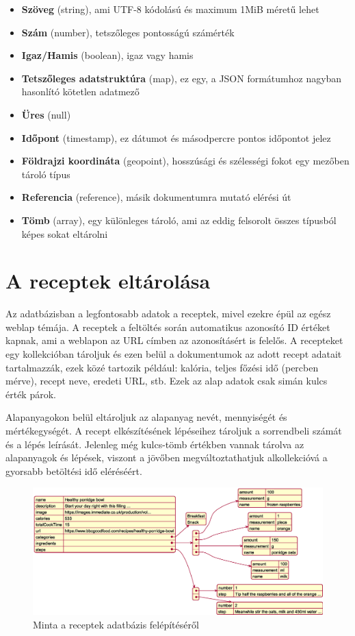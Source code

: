 \documentclass[12pt]{report}
\theoremstyle{definition}
\begin{document}
\begin{itemize}
	\item \textbf{Szöveg} (string), ami UTF-8 kódolású és maximum 1MiB méretű lehet
	\item \textbf{Szám} (number),  tetszőleges pontosságú számérték
	\item \textbf{Igaz/Hamis} (boolean), igaz vagy hamis
	\item \textbf{Tetszőleges adatstruktúra} (map), ez egy, a \Gls{JSON} formátumhoz nagyban hasonlító kötetlen adatmező
	\item \textbf{Üres} (null)
	\item \textbf{Időpont} (timestamp), ez dátumot és másodpercre pontos időpontot jelez

	\item \textbf{Földrajzi koordináta} (geopoint), hosszúsági és szélességi fokot egy mezőben tároló típus

	\item \textbf{Referencia} (reference), másik dokumentumra mutató elérési út
	\item \textbf{Tömb} (array), egy különleges tároló, ami az eddig felsorolt összes típusból képes sokat eltárolni

\end{itemize}
 

\section{A receptek eltárolása}
Az adatbázisban a legfontosabb adatok a receptek, mivel ezekre épül az egész weblap témája. A receptek a feltöltés során automatikus azonosító ID értéket kapnak, ami a weblapon az URL címben az azonosításért is felelős. A recepteket egy kollekcióban tároljuk és ezen belül a dokumentumok az adott recept adatait tartalmazzák, ezek közé tartozik például: kalória, teljes főzési idő (percben mérve), recept neve, eredeti URL, stb. Ezek az alap adatok csak simán kulcs érték párok.

Alapanyagokon belül eltároljuk az alapanyag nevét, mennyiségét és mértékegységét. A recept elkészítésének lépéseihez tároljuk a sorrendbeli számát és a lépés leírását. Jelenleg még kulcs-tömb értékben vannak tárolva az alapanyagok és lépések, viszont a jövőben megváltoztathatjuk alkollekcióvá a gyorsabb betöltési idő eléréséért.

\noindent
\begin{figure}[H]
	\centering
	\includegraphics[width=\textwidth]{out/diagrams/jsonRecipes/jsonRecipes.eps}
	\caption{Minta a receptek adatbázis felépítéséről}
    \label{fig:jsonRecipes}
\end{figure}
\end{document}
